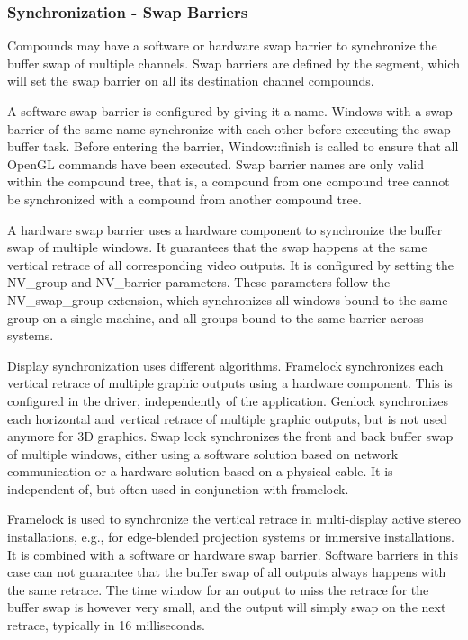 \documentclass[10pt,a4]{scrartcl}
\begin{document}
\subsubsection{\label{sSwapBarrier}Synchronization - Swap Barriers}
Compounds may have a software or hardware swap barrier to synchronize the buffer
swap of multiple channels. Swap barriers are defined by the segment, which will
set the swap barrier on all its destination channel compounds.

A software swap barrier is configured by giving it a name. Windows with a swap
barrier of the same name synchronize with each other before executing the swap
buffer task. Before entering the barrier, \textsf{Window::finish} is called to
ensure that all OpenGL commands have been executed.  Swap barrier names are only
valid within the compound tree, that is, a compound from one compound tree
cannot be synchronized with a compound from another compound tree.

A hardware swap barrier uses a hardware component to synchronize the buffer swap
of multiple windows. It guarantees that the swap happens at the same vertical
retrace of all corresponding video outputs.  It is configured by setting the
\textsf{NV\_group} and \textsf{NV\_barrier} parameters. These parameters follow
the \textsf{NV\_swap\_group} extension, which synchronizes all windows bound to
the same group on a single machine, and all groups bound to the same barrier
across systems.

Display synchronization uses different algorithms. Framelock synchronizes each
vertical retrace of multiple graphic outputs using a hardware component. This is
configured in the driver, independently of the application. Genlock synchronizes
each horizontal and vertical retrace of multiple graphic outputs, but is not
used anymore for 3D graphics. Swap lock synchronizes the front and back buffer
swap of multiple windows, either using a software solution based on network
communication or a hardware solution based on a physical cable. It is
independent of, but often used in conjunction with framelock.

Framelock is used to synchronize the vertical retrace in multi-display active
stereo installations, e.g., for edge-blended projection systems or immersive
installations. It is combined with a software or hardware swap barrier. Software
barriers in this case can not guarantee that the buffer swap of all outputs
always happens with the same retrace. The time window for an output to miss the
retrace for the buffer swap is however very small, and the output will simply
swap on the next retrace, typically in 16 milliseconds.
\end{document}
